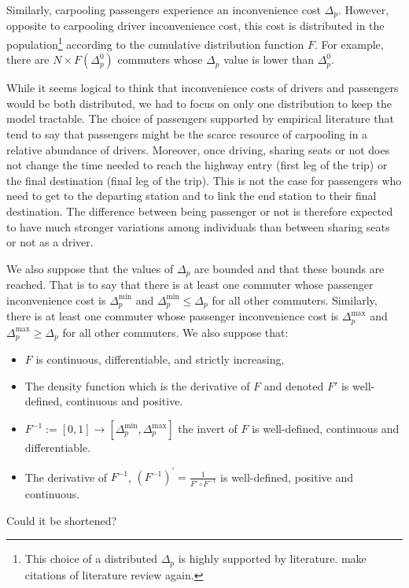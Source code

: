 \documentclass[english, a4paper]{article}
\theoremstyle{plain}
\theoremstyle{definition}
\theoremstyle{remark}
\begin{document}
Similarly, carpooling passengers experience an inconvenience cost $\Delta _p$. However, opposite to carpooling driver inconvenience cost, this cost is distributed in the population\footnote{This choice of a distributed $\Delta_p$ is highly supported by literature. \alert{make citations of literature review again}.} according to the cumulative distribution function $F$. For example, there are $N \times F(\Delta _p ^0)$ commuters whose $\Delta _p$ value is lower than $\Delta _p ^0$.

While it seems logical to think that inconvenience costs of drivers and passengers would be both distributed, we had to focus on only one distribution to keep the model tractable. The choice of passengers supported by empirical literature \parencites{le_goff_are_2022, olave-cruz_does_2025} that tend to say that passengers might be the scarce resource of carpooling in a relative abundance of drivers. Moreover, once driving, sharing seats or not does not change the time needed to reach the highway entry (first leg of the trip) or the final destination (final leg of the trip). This is not the case for passengers who need to get to the departing station and to link the end station to their final destination. The difference between being passenger or not is therefore expected to have much stronger variations among individuals than between sharing seats or not as a driver.

We also suppose that the values of $\Delta _p$ are bounded and that these bounds are reached. That is to say that there is at least one commuter whose passenger inconvenience cost is $\Delta _p ^{\text{min}}$ and $\Delta _p^{\text{min}} \leq \Delta _p$ for all other commuters. Similarly, there is at least one commuter whose passenger inconvenience cost is $\Delta _p ^{\text{max}}$ and $\Delta _p^{\text{max}} \geq \Delta _p$ for all other commuters. We also suppose that:
\begin{itemize}
    \item $F$ is continuous, differentiable, and strictly increasing,
    \item The density function which is the derivative of $F$ and denoted $F'$ is well-defined, continuous and positive.
    \item $F^{-1} := [0, 1] \longrightarrow [\Delta_p^{\text{min}}, \Delta_p^{\text{max}}]$ the invert of $F$ is well-defined, continuous and differentiable.
    \item The derivative of $F^{-1}$, $(F^{-1})^{'} = \frac{1}{F'\circ F^{-1}}$ is well-defined, positive and continuous.
\end{itemize}
\alert{Could it be shortened?}
\end{document}
